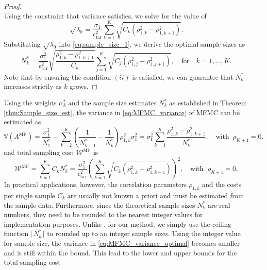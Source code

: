 \begin{proof}
\begin{equation*}
\end{equation*}
%
Using the constraint that variance satisfies, we solve for the value of 
%
\[
\sqrt{\lambda_0} = \frac{\sigma_1}{\epsilon_{\text{tar}}^2}\sum_{k=1}^K\sqrt{C_k\left(\rho_{1,k}^2-\rho_{1,k+1}^2\right)}.
\]
%
Substituting $\sqrt{\lambda_0}$ into \eqref{eq:sample_size_1}, we derive the optimal sample sizes as
%
\[
N_k^* = \frac{\sigma_1^2}{\epsilon_{\text{tar}}^2}\sqrt{\frac{\rho_{1,k}^2-\rho_{1,k+1}^2}{C_k}}\sum_{j=1}^K\sqrt{C_j\left(\rho_{1,j}^2-\rho_{1,j+1}^2\right)},\quad \text{for}\quad  k=1,\ldots,K.
\]
%
Note that by ensuring the condition $(ii)$ is satisfied, we can guarantee that $N_k^*$ increases strictly as $k$ grows. 
\end{proof}
%
Using the weights $\alpha_k^*$ and the sample size estimates $N_k^*$ as established in Theorem \ref{thm:Sample_size_est}, the variance in \eqref{eq:MFMC_variance} of MFMC can be estimated as
%
\begin{equation}
\label{eq:MFMC_variance_optimal}
\mathbb{V}\left(A^{\text{MF}}\right) =\frac{\sigma_1^2}{N_1^*} - \sum_{k=2}^K \left(\frac{1}{N_{k-1}^*} - \frac{1}{N_k^*}\right)\rho_{1,k}^2\sigma_1^2=\sigma_1^2 \sum_{k=1}^K\frac{\rho_{1,k}^2 - \rho_{1,k+1}^2}{N_k^*},\quad \text{with}\;\;\rho_{K+1}=0.
\end{equation}
%
and total sampling cost $\mathcal{W}^\text{MF}$ is
%
\begin{equation}\label{eq:MFMC_sampling_cost}
    \mathcal{W}^\text{MF} = \sum_{k=1}^K C_k N_k^* = \frac{\sigma_1^2}{\epsilon_{\text{tar}}^2}\left(\sum_{k=1}^K\sqrt{C_k\left(\rho_{1,k}^2 - \rho_{1,k+1}^2\right)}\right)^2,\quad \text{with}\;\;\rho_{K+1}=0.
\end{equation}
%
In practical applications, however, the correlation parameters $\rho_{1,k}$ and the costs per single sample $C_k$ are usually not known a priori and must be estimated from the sample data. Furthermore, since the theoretical sample sizes $N_k^*$ are real numbers, they need to be rounded to the nearest integer values for implementation purposes. Unlike \cite{GrGuJuWa:2023, PeWiGu:2016}, for our method, we simply use the ceiling function $\lceil N_k^* \rceil$ to rounded up to an integer sample sizes. Using the integer value for sample size, the variance in \eqref{eq:MFMC_variance_optimal} becomes smaller and is still within the bound. This lead to the lower and upper bounds for the total sampling cost
%
